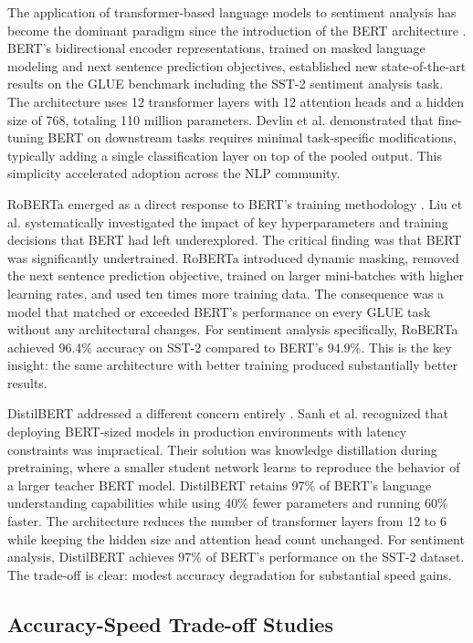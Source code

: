 \documentclass[conference]{IEEEtran}
\begin{document}
The application of transformer-based language models to sentiment analysis has become the dominant paradigm since the introduction of the BERT architecture \cite{r6}. BERT's bidirectional encoder representations, trained on masked language modeling and next sentence prediction objectives, established new state-of-the-art results on the GLUE benchmark including the SST-2 sentiment analysis task. The architecture uses 12 transformer layers with 12 attention heads and a hidden size of 768, totaling 110 million parameters. Devlin et al. demonstrated that fine-tuning BERT on downstream tasks requires minimal task-specific modifications, typically adding a single classification layer on top of the pooled output. This simplicity accelerated adoption across the NLP community.

RoBERTa emerged as a direct response to BERT's training methodology \cite{r7}. Liu et al. systematically investigated the impact of key hyperparameters and training decisions that BERT had left underexplored. The critical finding was that BERT was significantly undertrained. RoBERTa introduced dynamic masking, removed the next sentence prediction objective, trained on larger mini-batches with higher learning rates, and used ten times more training data. The consequence was a model that matched or exceeded BERT's performance on every GLUE task without any architectural changes. For sentiment analysis specifically, RoBERTa achieved 96.4\% accuracy on SST-2 compared to BERT's 94.9\%. This is the key insight: the same architecture with better training produced substantially better results.

DistilBERT addressed a different concern entirely \cite{r8}. Sanh et al. recognized that deploying BERT-sized models in production environments with latency constraints was impractical. Their solution was knowledge distillation during pretraining, where a smaller student network learns to reproduce the behavior of a larger teacher BERT model. DistilBERT retains 97\% of BERT's language understanding capabilities while using 40\% fewer parameters and running 60\% faster. The architecture reduces the number of transformer layers from 12 to 6 while keeping the hidden size and attention head count unchanged. For sentiment analysis, DistilBERT achieves 97\% of BERT's performance on the SST-2 dataset. The trade-off is clear: modest accuracy degradation for substantial speed gains.

\subsection{Accuracy-Speed Trade-off Studies}
\end{document}
